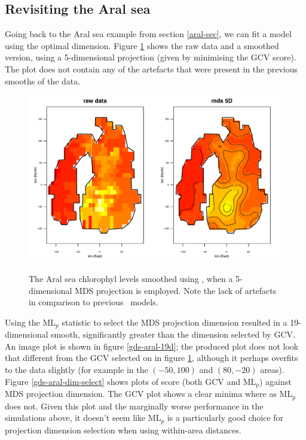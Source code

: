 \subsection{Revisiting the Aral sea}

Going back to the Aral sea example from section \ref{aral-sec}, we can fit a model using the optimal dimension. Figure \ref{mds-aral-5d-duchon} shows the raw data and a smoothed version, using a 5-dimensional projection (given by minimising the GCV score). The plot does not contain any of the artefacts that were present in the previous smooths of the data.

\begin{figure}
\centering
\includegraphics[width=6in]{mds/figs/aral-5d-duchon.pdf} \\
\caption{The Aral sea chlorophyl levels smoothed using \mdsds, when a 5-dimensional MDS projection is employed. Note the lack of artefacts in comparison to previous \mdsap\ models.}
\label{mds-aral-5d-duchon}
\end{figure}

Using the $\text{ML}_p$ statistic to select the MDS projection dimension resulted in a 19-dimensional smooth, significantly greater than the dimension selected by GCV. An image plot is shown in figure \ref{gds-aral-19d}; the produced plot does not look that different from the GCV selected on in figure \ref{mds-aral-5d-duchon}, although it perhaps overfits to the data slightly (for example in the $(-50,100)$ and $(80,-20)$ areas). Figure \ref{gds-aral-dim-select} shows plots of score (both GCV and $\text{ML}_p$) against MDS projection dimension. The GCV plot shows a clear minima where as $\text{ML}_p$ does not. Given this plot and the marginally worse performance in the simulations above, it doesn't seem like $\text{ML}_p$ is a particularly good choice for projection dimension selection when using within-area distances.


